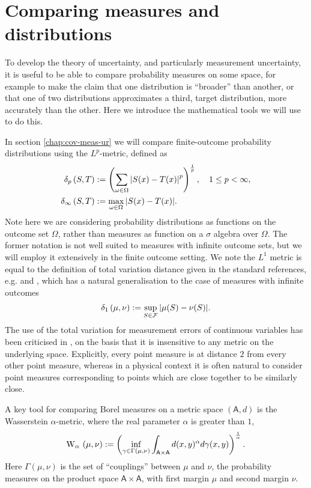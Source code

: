 \section{Comparing measures and distributions}
\label{sec:comp-measures-and-dists}
To develop the theory of uncertainty, and particularly measurement uncertainty, it is useful to be able to compare probability measures on some space, for example to make the claim that one distribution is ``broader'' than another, or that one of two distributions approximates a third, target distribution, more accurately than the other. Here we introduce the mathematical tools we will use to do this.

In section \ref{chap:cov-meas-ur} we will compare finite-outcome probability distributions using the $L^p$-metric, defined as
\begin{align}
  \label{eqn:lpvar-defn}
  \lPVar{S}{T}[p]&\defeq \left(\sum_{\omega\in\Omega} \abs{S(x) - T(x)}^p\right)^\frac{1}{p}, \quad 1\leq p < \infty,\\
  \lPVar{S}{T}[\infty] &\defeq \max_{\omega\in\Omega} \abs{S(x) - T(x)}.
\end{align}
Note here we are considering probability distributions as functions on the outcome set $\Omega$, rather than measures as function on a $\sigma$ algebra over $\Omega$. The former notation is not well suited to measures with infinite outcome sets, but we will employ it extensively in the finite outcome setting. We note the $L^1$ metric is equal to the definition of total variation distance given in the standard references, e.g. \cite{optimal-transport-villani} and \cite{topics-optimal-transport}, which has a natural generalisation to the case of measures with infinite outcomes
\begin{align}
  \lPVar{\mu}{\nu}[1] \defeq \sup_{S\in\fcal}\abs{\mu(S) - \nu(S)}.
\end{align}
The use of the total variation for measurement errors of continuous variables has been criticised in \cite{blw-meas-uncertainty}, on the basis that it is insensitive to any metric on the underlying space. Explicitly, every point measure is at distance $2$ from every other point measure, whereas in a physical context it is often natural to consider point measures corresponding to points which are close together to be similarly close.

A key tool for comparing Borel measures on a metric space $(\mathsf{A}, d)$ is the Wasserstein $\alpha$-metric, where the real parameter $\alpha$ is greater than $1$,
\begin{align}
  \ws{\mu,\nu}[\alpha]  \defeq \left(\inf_{\gamma\in\Gamma(\mu,\nu)} \int_{\mathsf{A}\times\mathsf{A}} d(x,y)^\alpha d\gamma(x,y)\right)^\frac{1}{\alpha}.\label{eq:wasserstein-prob-dists}
\end{align}
Here $\Gamma(\mu,\nu)$ is the set of ``couplings'' between $\mu$ and $\nu$, the probability measures on the product space $\mathsf{A}\times\mathsf{A}$, with first margin $\mu$ and second margin $\nu$.


